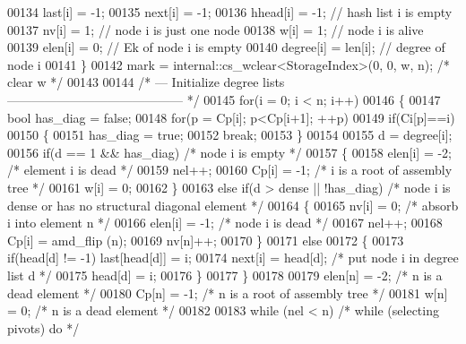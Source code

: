 \begin{DoxyCode}
00134     last[i]   = -1;
00135     next[i]   = -1;
00136     hhead[i]  = -1;                     \textcolor{comment}{// hash list i is empty }
00137     nv[i]     = 1;                      \textcolor{comment}{// node i is just one node}
00138     w[i]      = 1;                      \textcolor{comment}{// node i is alive}
00139     elen[i]   = 0;                      \textcolor{comment}{// Ek of node i is empty}
00140     degree[i] = len[i];                 \textcolor{comment}{// degree of node i}
00141   \}
00142   mark = internal::cs\_wclear<StorageIndex>(0, 0, w, n);         \textcolor{comment}{/* clear w */}
00143   
00144   \textcolor{comment}{/* --- Initialize degree lists ------------------------------------------ */}
00145   \textcolor{keywordflow}{for}(i = 0; i < n; i++)
00146   \{
00147     \textcolor{keywordtype}{bool} has\_diag = \textcolor{keyword}{false};
00148     \textcolor{keywordflow}{for}(p = Cp[i]; p<Cp[i+1]; ++p)
00149       \textcolor{keywordflow}{if}(Ci[p]==i)
00150       \{
00151         has\_diag = \textcolor{keyword}{true};
00152         \textcolor{keywordflow}{break};
00153       \}
00154    
00155     d = degree[i];
00156     \textcolor{keywordflow}{if}(d == 1 && has\_diag)           \textcolor{comment}{/* node i is empty */}
00157     \{
00158       elen[i] = -2;                 \textcolor{comment}{/* element i is dead */}
00159       nel++;
00160       Cp[i] = -1;                   \textcolor{comment}{/* i is a root of assembly tree */}
00161       w[i] = 0;
00162     \}
00163     \textcolor{keywordflow}{else} \textcolor{keywordflow}{if}(d > dense || !has\_diag)  \textcolor{comment}{/* node i is dense or has no structural diagonal element */}
00164     \{
00165       nv[i] = 0;                    \textcolor{comment}{/* absorb i into element n */}
00166       elen[i] = -1;                 \textcolor{comment}{/* node i is dead */}
00167       nel++;
00168       Cp[i] = amd\_flip (n);
00169       nv[n]++;
00170     \}
00171     \textcolor{keywordflow}{else}
00172     \{
00173       \textcolor{keywordflow}{if}(head[d] != -1) last[head[d]] = i;
00174       next[i] = head[d];           \textcolor{comment}{/* put node i in degree list d */}
00175       head[d] = i;
00176     \}
00177   \}
00178   
00179   elen[n] = -2;                         \textcolor{comment}{/* n is a dead element */}
00180   Cp[n] = -1;                           \textcolor{comment}{/* n is a root of assembly tree */}
00181   w[n] = 0;                             \textcolor{comment}{/* n is a dead element */}
00182   
00183   \textcolor{keywordflow}{while} (nel < n)                         \textcolor{comment}{/* while (selecting pivots) do */}

\end{DoxyCode}
